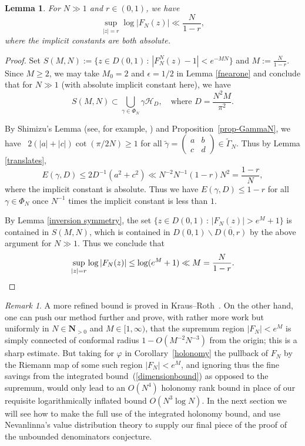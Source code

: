 \documentclass[10pt]{amsart}
\def\NwithoutzeroA{\mathbf{N}_{> 0}}
\renewcommand\setminus{\smallsetminus}
\def\HH{\mathcal{H}}
\newtheorem{lemma}[subsubsection]{Lemma}
\theoremstyle{remark}
\newtheorem{remark}[subsubsection]{Remark}
\numberwithin{equation}{subsection}
\begin{document}
\begin{lemma}\label{trivialsupFN}
For $N \gg 1$ and $r\in (0,1)$, we have
\[\sup_{|z|=r} \log |F_N(z)|\ll \frac{N}{1-r},\]
where the implicit constants are both absolute.
\end{lemma}
\begin{proof}
Set $S(M,N):=\{z\in D(0,1) \, : \, |F_N^N(z)-1|< e^{-MN}\}$ and $M := \frac{N}{1-r}$. Since $M\geq 2$, we may take $M_0=2$ and $\epsilon=1/2$ in Lemma \ref{fnearone} and conclude that for $N\gg 1$ (with absolute implicit constant here), we have
$$
S(M,N)   \subset  \bigcup_{\gamma \in \Phi_N}\gamma \HH_D,  \quad \textrm{where }  D=\frac{N^2M}{\pi^2}.
$$

By Shimizu's Lemma (see, for example, \cite[Theorem~3.1]{ElstrodtGrunewaldMennicke}) and Proposition~\ref{prop-GammaN}, we have ~$2(|a|+|c|) \cot(\pi/2N) \ge 1$ for all $\widetilde{\gamma} =\left( \begin{matrix} a & b \\ c & d \end{matrix} \right) \in \widetilde{\Gamma}_N$. Thus by Lemma \ref{translates}, \[E(\gamma,D)\leq 2D^{-1}(a^2+c^2) \ll  N^{-2}N^{-1}(1-r) N^2=\frac{1-r}{N},\]
where the implicit constant is absolute. Thus we have $E(\gamma,D)\leq 1-r$ for all $\gamma \in \Phi_N$ once $N^{-1}$ times the implicit constant is less than $1$.

By Lemma \ref{inversion symmetry}, the set $\{z \in D(0,1) \, : \, |F_N(z)|> e^{M}+1\}$ is contained in $S(M,N)$, which is contained in $D(0,1) \setminus \overline{D(0,r)}$ by the above argument for $N\gg 1$. Thus we conclude that
\[\sup_{|z|=r} \log |F_N(z)| \leq \log(e^M +1) \ll M =\frac{N}{1-r}.\qedhere\]
\end{proof}

\begin{remark}  \label{Renggli note}
A more refined bound is proved in Kraus--Roth~\cite[Theorems~1.2 and 1.10]{KrausRoth}. On the other hand,
one can push our method further and prove, with rather more work but uniformly in $N \in \NwithoutzeroA$ and $M \in [1,\infty)$, that the supremum region $|F_N| < e^M$ is simply connected of conformal radius $1 - O(M^{-2}N^{-3})$
from the origin; this is a sharp estimate.  But taking for $\varphi$ in Corollary~\ref{holonomy} the pullback of $F_N$ by the Riemann map of some such region $|F_N| < e^M$, and
ignoring thus the fine savings from the integrated bound~(\ref{dimensionbound}) as opposed to the supremum,  would only lead to an $O(N^4)$ holonomy rank bound in place of our requisite logarithmically inflated bound $O(N^3\log{N})$. In the next section we will see how to make the full use of the integrated holonomy bound, and use Nevanlinna's value distribution theory to supply our final piece of the proof of the unbounded denominators conjecture. 
\end{remark}
\end{document}
